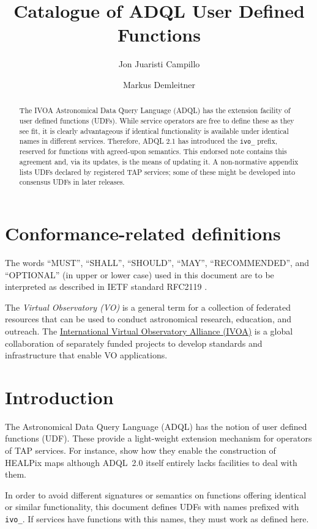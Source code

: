 \documentclass[11pt,a4paper]{ivoa}
\title{Catalogue of ADQL User Defined Functions}
\author[https://wiki.ivoa.net/twiki/bin/view/IVOA/JonJuaristiCampillo]{Jon Juaristi Campillo}
\author[https://wiki.ivoa.net/twiki/bin/view/IVOA/MarkusDemleitner]{Markus Demleitner}
\begin{document}
\begin{abstract}
The IVOA Astronomical Data Query Language (ADQL) has the extension
facility of user defined functions (UDFs).  While service operators are
free to define these as they see fit, it is clearly advantageous if
identical functionality is available under identical names in different
services.  Therefore, ADQL 2.1 has introduced the \verb|ivo_| prefix,
reserved for functions with agreed-upon semantics.  This endorsed note
contains this agreement and, via its updates, is the means of updating
it.  A non-normative appendix lists UDFs declared by registered TAP
services; some of these might be developed into consensus UDFs in later
releases.
\end{abstract}


\section*{Conformance-related definitions}

The words ``MUST'', ``SHALL'', ``SHOULD'', ``MAY'', ``RECOMMENDED'', and
``OPTIONAL'' (in upper or lower case) used in this document are to be
interpreted as described in IETF standard RFC2119 \citep{std:RFC2119}.

The \emph{Virtual Observatory (VO)} is a
general term for a collection of federated resources that can be used
to conduct astronomical research, education, and outreach.
The \href{http://www.ivoa.net}{International
Virtual Observatory Alliance (IVOA)} is a global
collaboration of separately funded projects to develop standards and
infrastructure that enable VO applications.


\section{Introduction}

The Astronomical Data Query Language (ADQL) \citep{2008ivoa.spec.1030O}
has the notion of user defined functions (UDF).  These provide a
light-weight extension mechanism for operators of TAP services.
For instance, \citet{2016arXiv161109190T} show how they enable the
construction of HEALPix maps although ADQL~2.0 itself entirely lacks
facilities to deal with them.

In order to avoid different signatures or semantics on functions
offering identical or similar functionality,  this document defines UDFs
with names prefixed with \verb|ivo_|.  If services have functions with
this names, they must work as defined here.
\end{document}
